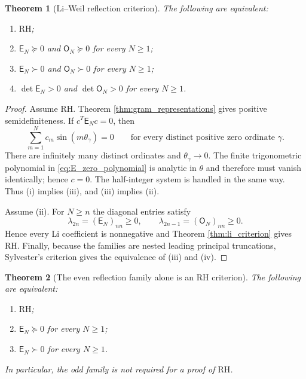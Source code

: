 \documentclass[11pt]{amsart}
\numberwithin{equation}{section}
\theoremstyle{plain}
\newtheorem{theorem}{Theorem}[section]
\theoremstyle{definition}
\theoremstyle{remark}
\newcommand{\RH}{\mathrm{RH}}
\newcommand{\E}{\mathsf E}
\newcommand{\Omat}{\mathsf O}
\begin{document}
\begin{theorem}[Li--Weil reflection criterion]
\label{thm:main_criterion}
The following are equivalent:
\begin{enumerate}[label=(\roman*)]
\item $\RH$;
\item $\E_N\succeq0$ and $\Omat_N\succeq0$ for every $N\ge1$;
\item $\E_N\succ0$ and $\Omat_N\succ0$ for every $N\ge1$;
\item $\det\E_N>0$ and $\det\Omat_N>0$ for every $N\ge1$.
\end{enumerate}
\end{theorem}

\begin{proof}
Assume $\RH$. Theorem \ref{thm:gram_representations} gives positive semidefiniteness. If $c^T\E_Nc=0$, then
\begin{equation}
\sum_{m=1}^{N}c_m\sin(m\theta_\gamma)=0
\qquad\text{for every distinct positive zero ordinate }\gamma.
\label{eq:E_zero_polynomial}
\end{equation}
There are infinitely many distinct ordinates and $\theta_\gamma\to0$. The finite trigonometric polynomial in \eqref{eq:E_zero_polynomial} is analytic in $\theta$ and therefore must vanish identically; hence $c=0$. The half-integer system is handled in the same way. Thus (i) implies (iii), and (iii) implies (ii).

Assume (ii). For $N\ge n$ the diagonal entries satisfy
\begin{equation}
\lambda_{2n}=(\E_N)_{nn}\ge0,
\qquad
\lambda_{2n-1}=(\Omat_N)_{nn}\ge0.
\label{eq:recover_li_from_diagonal}
\end{equation}
Hence every Li coefficient is nonnegative and Theorem \ref{thm:li_criterion} gives $\RH$. Finally, because the families are nested leading principal truncations, Sylvester's criterion gives the equivalence of (iii) and (iv).
\end{proof}

\begin{theorem}[The even reflection family alone is an RH criterion]
\label{thm:even_family_alone}
The following are equivalent:
\begin{enumerate}[label=(\roman*)]
\item \(\RH\);
\item \(\E_N\succeq0\) for every \(N\ge1\);
\item \(\E_N\succ0\) for every \(N\ge1\).
\end{enumerate}
In particular, the odd family is not required for a proof of \(\RH\).
\end{theorem}
\end{document}

